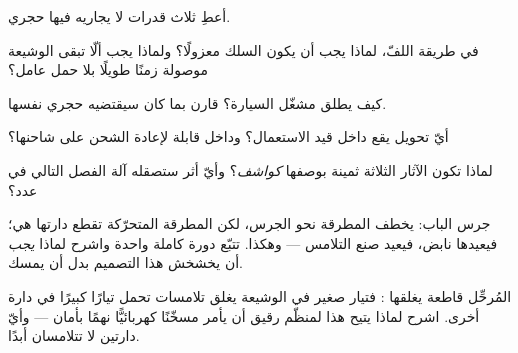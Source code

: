 \begin{exercise}[$\star$]\label{exo:g8:electric-current-effects:4}
أعطِ ثلاث قدرات  لا يجاريه فيها 
حجري.
\end{exercise}

\begin{exercise}[$\star$]\label{exo:g8:electric-current-effects:5}
في طريقة اللفّ، لماذا يجب أن يكون السلك معزولًا؟ ولماذا يجب
ألّا تبقى الوشيعة موصولة زمنًا طويلًا بلا حمل عامل؟
\end{exercise}

\begin{exercise}[$\star$]\label{exo:g8:electric-current-effects:6}
كيف يطلق مشغّل  السيارة؟ قارن بما كان سيقتضيه 
حجري  نفسها.
\end{exercise}

\begin{exercise}[$\star$]\label{exo:g8:electric-current-effects:7}
أيّ تحويل  يقع داخل  قيد الاستعمال؟ وداخل 
قابلة لإعادة الشحن على شاحنها؟
\end{exercise}

\begin{exercise}[$\star$]\label{exo:g8:electric-current-effects:8}
لماذا تكون الآثار الثلاثة ثمينة بوصفها \emph{كواشف}؟ وأيّ أثر
ستصقله آلة الفصل التالي في عدد؟
\end{exercise}

\begin{exercise}[$\star\star$]\label{exo:g8:electric-current-effects:9}
جرس الباب:  يخطف المطرقة نحو الجرس، لكن المطرقة
المتحرّكة تقطع دارتها هي؛ فيعيدها نابض، فيعيد صنع التلامس ---
وهكذا. تتبّع دورة كاملة واحدة واشرح لماذا \emph{يجب} أن يخشخش
هذا التصميم بدل أن يمسك.
\end{exercise}

\begin{exercise}[$\star\star$]\label{exo:g8:electric-current-effects:10}
المُرحِّل قاطعة يغلقها : فتيار صغير في الوشيعة
يغلق تلامسات تحمل تيارًا كبيرًا في دارة أخرى. اشرح لماذا يتيح
هذا لمنظّم  رقيق أن يأمر مسخّنًا كهربائيًّا نهمًا بأمان ---
وأيّ دارتين لا تتلامسان أبدًا.
\end{exercise}

